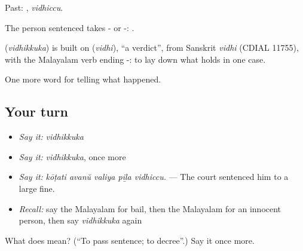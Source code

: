 Past: , \emph{vidhiccu}.

The person sentenced takes - or -:   .

\begin{cousinweb}
\textbf{} (\emph{vidhikkuka}) is built on  (\emph{vidhi}), \textquotedblleft{}a verdict\textquotedblright{}, from Sanskrit \emph{vidhi} (CDIAL 11755), with the Malayalam verb ending -: to lay down what holds in one case.
\end{cousinweb}

\begin{grammarlens}[title={What you've built}]
One more word for telling what happened.
\end{grammarlens}

\subsection*{Your turn}
\begin{itemize}
\raggedright
  \item \emph{Say it:} \emph{vidhikkuka}
  \item \emph{Say it:} \emph{vidhikkuka}, once more
  \item \emph{Say it:} \emph{kōṭati avanŭ valiya piḻa vidhiccu.} — The court sentenced him to a large fine.
  \item \emph{Recall:} say the Malayalam for bail, then the Malayalam for an innocent person, then say \emph{vidhikkuka} again
\end{itemize}

\begin{tcolorbox}[breakable,colback=teal!4,colframe=teal!35!black,title={Before you move on}]
What does  mean? (\textquotedblleft{}To pass sentence; to decree\textquotedblright{}.) Say it once more.
\end{tcolorbox}
